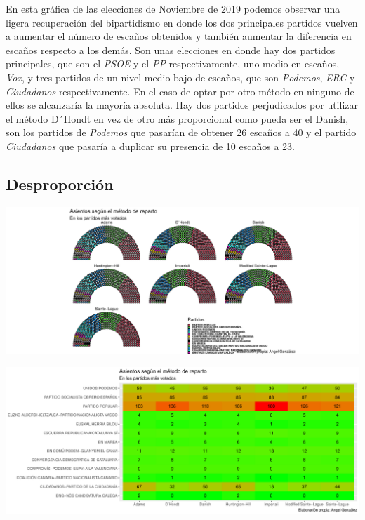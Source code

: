 \documentclass[12pt,a4paper,]{book}
\numberwithin{dummy}{section}
\theoremstyle{ocrenumbox}
\theoremstyle{blacknumex}
\theoremstyle{blacknumbox}
\theoremstyle{ocrenum}
\theoremstyle{ocrenum}
\begin{document}
En esta gráfica de las elecciones de Noviembre de 2019 podemos observar
una ligera recuperación del bipartidismo en donde los dos principales
partidos vuelven a aumentar el número de escaños obtenidos y también
aumentar la diferencia en escaños respecto a los demás. Son unas
elecciones en donde hay dos partidos principales, que son el \emph{PSOE}
y el \emph{PP} respectivamente, uno medio en escaños, \emph{Vox}, y tres
partidos de un nivel medio-bajo de escaños, que son \emph{Podemos},
\emph{ERC} y \emph{Ciudadanos} respectivamente. En el caso de optar por
otro método en ninguno de ellos se alcanzaría la mayoría absoluta. Hay
dos partidos perjudicados por utilizar el método D´Hondt en vez de otro
más proporcional como pueda ser el Danish, son los partidos de
\emph{Podemos} que pasarían de obtener 26 escaños a 40 y el partido
\emph{Ciudadanos} que pasaría a duplicar su presencia de 10 escaños a
23.

\hypertarget{desproporciuxf3n-14}{%
\subsection{Desproporción}\label{desproporciuxf3n-14}}

\begin{center}\includegraphics[width=1\linewidth]{figurasR/unnamed-chunk-119-1} \end{center}

\begin{center}\includegraphics[width=1\linewidth]{figurasR/unnamed-chunk-119-2} \end{center}
\end{document}
